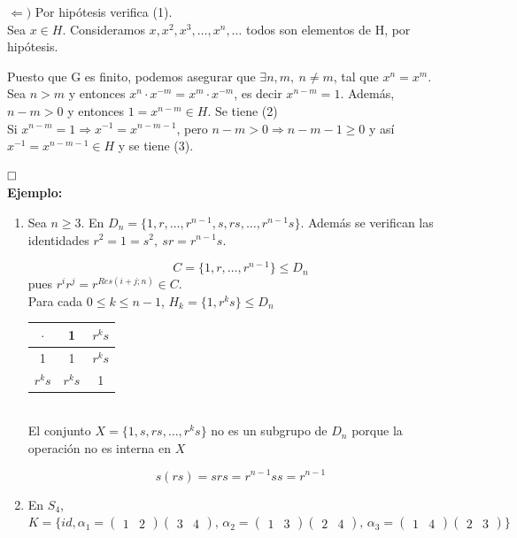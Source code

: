 \documentclass{article}
\begin{document}
$\Leftarrow)$ Por hipótesis verifica (1). \\

Sea $x \in H$. Consideramos $x, x^2, x^3, \ldots, x^n, \ldots$ todos son elementos de H, por hipótesis. 

Puesto que G es finito, podemos asegurar que $\exists n,m,\: n\neq m$, tal que $x^n=x^m$. Sea $n>m$ y entonces $x^n\cdot x^{-m}=x^m\cdot x^{-m}$, es decir $x^{n-m}=1$. Además, $n-m>0$ y entonces $1=x^{n-m}\in H$. Se tiene (2) \\

Si $x^{n-m}=1\Rightarrow x^{-1}=x^{n-m-1}$, pero $n-m>0 \Rightarrow n-m-1\geq 0$ y así $x^{-1}=x^{n-m-1} \in H$ y se tiene (3).

$\hfill\square$ \\

\textbf{Ejemplo:} 
\begin{enumerate}[1)]
\item Sea $n \geq 3$. En $D_n=\{1,r,\ldots,r^{n-1},s,rs,\ldots,r^{n-1}s\}$. Además se verifican las identidades $r^2=1=s^2, \: sr=r^{n-1}s$.

\begin{equation*}
C=\{1,r,\ldots,r^{n-1}\}\leq D_n
\end{equation*}
pues $r^ir^j=r^{Res(i+j;n)}\in C$. \\

Para cada $0\leq k \leq n-1$, $H_k=\{1,r^ks\}\leq D_n$ \\

\begin{tabular}{c | c c}
$\cdot$ & 1 & $r^ks$ \\
\hline 
1 & 1 & $r^ks$ \\
$r^ks$ & $r^ks$ & 1
\end{tabular} \\

El conjunto $X=\{1,s,rs,\ldots,r^ks\}$ no es un subgrupo de $D_n$ porque la operación no es interna en $X$

\begin{equation*}
s(rs)=srs=r^{n-1}ss=r^{n-1}
\end{equation*}

\item En $S_4$, $K=\{id, \alpha_1=
\begin{pmatrix}
1 & 2
\end{pmatrix}
\begin{pmatrix}
3 & 4
\end{pmatrix},\, 
\alpha_2=
\begin{pmatrix}
1 & 3
\end{pmatrix}
\begin{pmatrix}
2 & 4
\end{pmatrix},\, 
\alpha_3=
\begin{pmatrix}
1 & 4
\end{pmatrix}
\begin{pmatrix}
2 & 3
\end{pmatrix}\}$
\end{enumerate}
\end{document}
